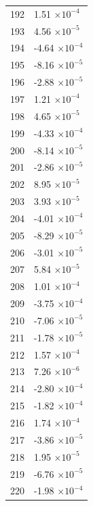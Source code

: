 \documentclass[a4paper,11pt]{article}
\begin{document}
\begin{center}
\begin{longtable}{|R{1.5cm}|R{2.5cm}|}
  192 &         1.51 $\times 10^{          -4}$ \\
  193 &         4.56 $\times 10^{          -5}$ \\
  194 &        -4.64 $\times 10^{          -4}$ \\
  195 &        -8.16 $\times 10^{          -5}$ \\
  196 &        -2.88 $\times 10^{          -5}$ \\
  197 &         1.21 $\times 10^{          -4}$ \\
  198 &         4.65 $\times 10^{          -5}$ \\
  199 &        -4.33 $\times 10^{          -4}$ \\
  200 &        -8.14 $\times 10^{          -5}$ \\
  201 &        -2.86 $\times 10^{          -5}$ \\
  202 &         8.95 $\times 10^{          -5}$ \\
  203 &         3.93 $\times 10^{          -5}$ \\
  204 &        -4.01 $\times 10^{          -4}$ \\
  205 &        -8.29 $\times 10^{          -5}$ \\
  206 &        -3.01 $\times 10^{          -5}$ \\
  207 &         5.84 $\times 10^{          -5}$ \\
  208 &         1.01 $\times 10^{          -4}$ \\
  209 &        -3.75 $\times 10^{          -4}$ \\
  210 &        -7.06 $\times 10^{          -5}$ \\
  211 &        -1.78 $\times 10^{          -5}$ \\
  212 &         1.57 $\times 10^{          -4}$ \\
  213 &         7.26 $\times 10^{          -6}$ \\
  214 &        -2.80 $\times 10^{          -4}$ \\
  215 &        -1.82 $\times 10^{          -4}$ \\
  216 &         1.74 $\times 10^{          -4}$ \\
  217 &        -3.86 $\times 10^{          -5}$ \\
  218 &         1.95 $\times 10^{          -5}$ \\
  219 &        -6.76 $\times 10^{          -5}$ \\
  220 &        -1.98 $\times 10^{          -4}$ \\

\end{longtable}
\end{center}
\end{document}
